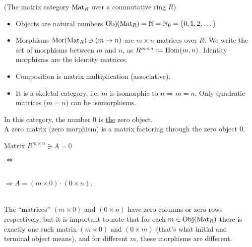\begin{example}{(The matrix category $\textup{Mat}_{R}$ over a commutative ring $R$)}\label{ex:matrix_category}
\begin{itemize}
\item Objects are natural numbers $\textup{Obj}(\textup{Mat}_{R}) = \mathbb{N} = \mathbb{N}_{0} = \{0,1,2,\dots\}$
\item Morphisms $\textup{Mor}(\textup{Mat}_{R}) \ni (m \rightarrow n)$ are $m \times n$ matrices over $R$.
We write the set of morphisms between $m$ and $n$, as $R^{m\times n} := \textup{Hom}(m,n)$. Identity morphisms are the
identity matrices.
\item Composition is matrix multiplication (associative).
\item It is a skeletal category, i.e. $m$ is isomorphic to $n \Rightarrow m = n$. Only quadratic matrices ($m = n$) can be
isomorphisms.
\end{itemize}
In this category, the number $0$ is \ul{the} zero object.\\
A zero matrix (zero morphism) is a matrix factoring through the zero object $0$.\\
\begin{minipage}{.2\textwidth}\phantom{ }\end{minipage}
\begin{minipage}{.25\textwidth}
Matrix $R^{m\times n} \ni A = 0$
\end{minipage}
\begin{minipage}{.08\textwidth}
$\Longleftrightarrow$
\end{minipage}
\begin{minipage}{.32\textwidth}
\\
$\Rightarrow A = (m \times 0) \cdot (0 \times n)$.
\end{minipage}
\begin{minipage}{.15\textwidth}\phantom{ }\end{minipage}\\
\noindent The ``matrices'' $(m \times 0)$ and $(0 \times n)$ have zero columns or zero rows respectively, but it is
important to note that for each $m \in \textup{Obj}(\textup{Mat}_{R})$ there is exactly one such matrix $(m \times 0)$ and $(0 \times m)$
(that's what initial and terminal object means), and for different $m$, these morphisms are different.
\end{example}


